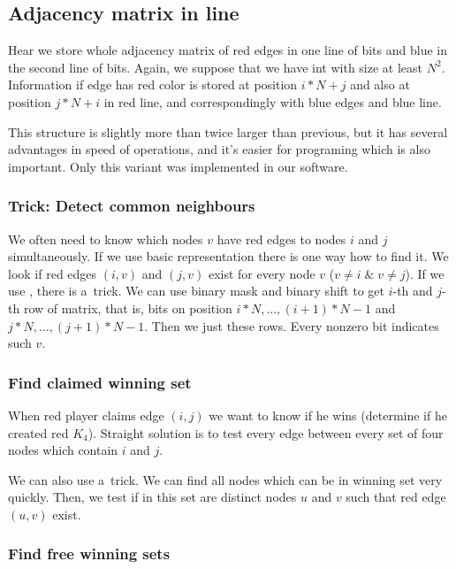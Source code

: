 \subsection{ Adjacency matrix in line}

Hear we store whole adjacency matrix of red edges in one line of bits and blue
in the second line of bits. Again, we suppose that we have int with size at least
$N^2$. Information if edge has red color is stored at position $i*N+j$ and
also at position $j*N+i$ in red line, and correspondingly with blue edges and
blue line.

This structure is slightly more than twice larger than previous, but it has
several advantages in speed of operations, and it's easier for programing which
is also important. Only this variant was implemented in our software.

\subsubsection{ Trick: Detect common neighbours }

We often need to know which nodes $v$ have red edges to nodes $i$ and $j$
simultaneously. If we use basic representation there is one way how to find it.
We look if red edges $(i,v)$ and $(j,v)$ exist for every node $v$ ($v \ne i \;
\& \; v \ne j$). If we use , there is a~trick. We can
use binary mask and binary shift to get $i$-th and $j$-th row of matrix, that is, bits
on position $i*N, \ldots, (i\!+\!1)\!*\!N\!-\!1$ and $j*N, \ldots,
(j\!+\!1)\!*\!N\!-\!1 $. Then we just  these rows. Every nonzero bit
indicates such $v$.

\subsubsection{ Find claimed winning set } 

When red player claims edge $(i,j)$ we want to know if he wins (determine if he
created red $K_4$). Straight solution is to test every edge between every set
of four nodes which contain $i$ and $j$. 

We can also use a~trick. We can find all nodes which can be in winning set very
quickly. Then, we test if in this set are distinct nodes $u$ and $v$ such that
red edge $(u,v)$ exist.


\subsubsection{ Find free winning sets }


